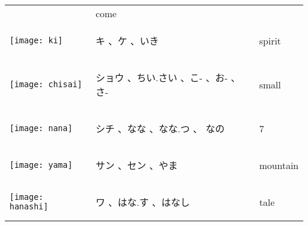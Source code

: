 \documentclass[a4paper,12pt]{extarticle}
\begin{document}
\begin{longtable}{|lp{6cm}p{4cm}|}
&
 come
\\ 
\begin{minipage}{0.3\textwidth}
\centerline{
	\texttt{[image: ki]}
}
\end{minipage}
&
\begin{CJK}{UTF8}{min} キ 、ケ 、いき\end{CJK}
&
 spirit
\\ 
\begin{minipage}{0.3\textwidth}
\centerline{
	\texttt{[image: chisai]}
}
\end{minipage}
&
\begin{CJK}{UTF8}{min} ショウ 、ちい.さい 、こ- 、お- 、さ-\end{CJK}
&
 small
\\ 
\begin{minipage}{0.3\textwidth}
\centerline{
	\texttt{[image: nana]}
}
\end{minipage}
&
\begin{CJK}{UTF8}{min} シチ 、なな 、なな.つ 、 なの\end{CJK}
&
 7
\\ 
\begin{minipage}{0.3\textwidth}
\centerline{
	\texttt{[image: yama]}
}
\end{minipage}
&
\begin{CJK}{UTF8}{min} サン 、セン 、やま\end{CJK}
&
 mountain
\\ 
\begin{minipage}{0.3\textwidth}
\centerline{
	\texttt{[image: hanashi]}
}
\end{minipage}
&
\begin{CJK}{UTF8}{min} ワ 、はな.す 、はなし\end{CJK}
&
 tale

\end{longtable}
\end{document}
